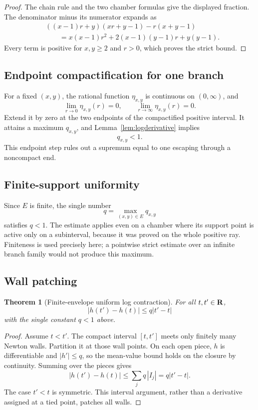 \documentclass[11pt]{article}
\newtheorem{theorem}{Theorem}[section]
\theoremstyle{definition}
\theoremstyle{remark}
\begin{document}
\begin{proof}
The chain rule and the two chamber formulas give the displayed fraction.
The denominator minus its numerator expands as
\[
\begin{aligned}
&((x-1)r+y)(xr+y-1)-r(x+y-1)\\
&\qquad=x(x-1)r^2+2(x-1)(y-1)r+y(y-1).
\end{aligned}
\]
Every term is positive for \(x,y\geq2\) and \(r>0\), which proves the
strict bound.
\end{proof}

\subsection{Endpoint compactification for one branch}

For a fixed \((x,y)\), the rational function \(\eta_{x,y}\) is
continuous on \((0,\infty)\), and
\[
\lim_{r\to0}\eta_{x,y}(r)=0,\qquad
\lim_{r\to\infty}\eta_{x,y}(r)=0.
\]
Extend it by zero at the two endpoints of the compactified positive
interval.  It attains a maximum \(q_{x,y}\), and
Lemma~\ref{lem:logderivative} implies
\[
q_{x,y}<1.
\]
This endpoint step rules out a supremum equal to one escaping through a
noncompact end.

\subsection{Finite-support uniformity}

Since \(E\) is finite, the single number
\[
q=\max_{(x,y)\in E}q_{x,y}
\]
satisfies \(q<1\).  The estimate applies even on a chamber where its
support point is active only on a subinterval, because it was proved on
the whole positive ray.  Finiteness is used precisely here; a pointwise
strict estimate over an infinite branch family would not produce this
maximum.

\subsection{Wall patching}

\begin{theorem}[Finite-envelope uniform log contraction]\label{thm:contraction}
For all \(t,t'\in\mathbf{R}\),
\[
|h(t')-h(t)|\leq q|t'-t|
\]
with the single constant \(q<1\) above.
\end{theorem}

\begin{proof}
Assume \(t<t'\).  The compact interval \([t,t']\) meets only finitely
many Newton walls.  Partition it at those wall points.  On each open
piece, \(h\) is differentiable and
\(|h'|\leq q\), so the mean-value bound holds on the closure by
continuity.  Summing over the pieces gives
\[
|h(t')-h(t)|
\leq\sum_jq\,|I_j|
=q|t'-t|.
\]
The case \(t'<t\) is symmetric.  This interval argument, rather
than a derivative assigned at a tied point, patches all walls.
\end{proof}
\end{document}

